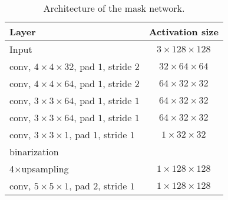 \documentclass[journal]{IEEEtran}
\begin{document}
\begin{table}[htb]
\footnotesize
\caption{Architecture of the mask network.}
\begin{center}
\begin{tabular}{l|c}
\hline
Layer&  Activation size  \\
\hline
Input& $3\times128\times128$ \\
conv, $4\times4\times32$, pad $1$, stride $2$ & $32\times64\times64$ \\
conv, $4\times4\times64$, pad $1$, stride $2$ & $64\times32\times32$ \\
conv, $3\times3\times64$, pad $1$, stride $1$ & $64\times32\times32$ \\
conv, $3\times3\times64$, pad $1$, stride $1$ & $64\times32\times32$ \\
conv, $3\times3\times1$, pad $1$, stride $1$ & $1\times32\times32$ \\
binarization\\
4$\times$upsampling & $1\times128\times128$\\
conv, $5\times5\times1$, pad $2$, stride $1$ &
$1\times128\times128$\\
\hline
\end{tabular}
\end{center}
\label{table:mask}
\end{table}
\end{document}
